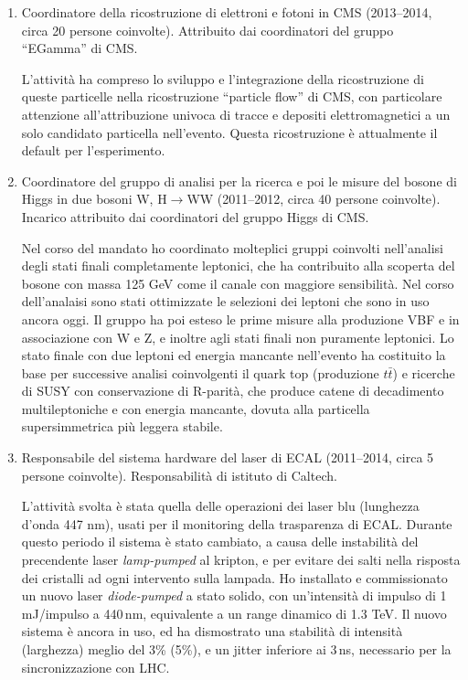 \documentclass[11pt,twoside,a4paper]{article}
\begin{document}
\begin{enumerate}
  \item Coordinatore della ricostruzione di elettroni e fotoni in CMS
    (2013--2014, circa 20 persone coinvolte). Attribuito dai
    coordinatori del gruppo ``EGamma'' di CMS.

    L'attivit\`a ha compreso lo sviluppo e l'integrazione della
    ricostruzione di queste particelle nella ricostruzione ``particle
    flow'' di CMS, con particolare attenzione all'attribuzione univoca
    di tracce e depositi elettromagnetici a un solo candidato
    particella nell'evento. Questa ricostruzione \`e attualmente il
    default per l'esperimento.

  \item Coordinatore del gruppo di analisi per la ricerca e poi le
    misure del bosone di Higgs in due bosoni W, H$\to$WW
    (2011--2012, circa 40 persone coinvolte). Incarico attribuito
    dai coordinatori del gruppo Higgs di CMS.

    Nel corso del mandato ho coordinato molteplici gruppi coinvolti
    nell'analisi degli stati finali completamente leptonici, che ha
    contribuito alla scoperta del bosone con massa 125 GeV come il
    canale con maggiore sensibilit\`a. Nel corso dell'analaisi sono
    stati ottimizzate le selezioni dei leptoni che sono in uso ancora
    oggi. Il gruppo ha poi esteso le prime misure alla produzione VBF
    e in associazione con W e Z, e inoltre agli stati finali non
    puramente leptonici. Lo stato finale con due leptoni ed energia
    mancante nell'evento ha costituito la base per successive analisi
    coinvolgenti il quark top (produzione $t\bar t$) e ricerche di
    SUSY con conservazione di R-parit\`a, che produce catene di
    decadimento multileptoniche e con energia mancante, dovuta alla
    particella supersimmetrica pi\`u leggera stabile.

  \item Responsabile del sistema hardware del laser di ECAL
    (2011--2014, circa 5 persone coinvolte). Responsabilit\`a di
    istituto di Caltech.

    L'attivit\`a svolta \`e stata quella delle operazioni dei laser
    blu (lunghezza d'onda 447 nm), usati per il monitoring della
    trasparenza di ECAL. Durante questo periodo il sistema \`e stato
    cambiato, a causa delle instabilit\`a del precendente laser
    \textit{lamp-pumped} al kripton, e per evitare dei salti nella
    risposta dei cristalli ad ogni intervento sulla lampada. Ho
    installato e commissionato un nuovo laser \textit{diode-pumped} a
    stato solido, con un'intensit\`a di impulso di 1 mJ/impulso a
    440\,nm, equivalente a un range dinamico di 1.3 TeV. Il nuovo
    sistema \`e ancora in uso, ed ha dismostrato una stabilit\`a di
    intensit\`a (larghezza) meglio del 3\% (5\%), e un jitter
    inferiore ai 3\,ns, necessario per la sincronizzazione con LHC.


\end{enumerate}
\end{document}
